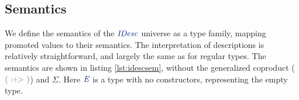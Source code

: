 \documentclass[a4paper,msc,twosized=semi]{uustthesis}
\newcommand*{\mathcolor}{}
\def\mathcolor#1#{\mathcoloraux{#1}}
\newcommand*{\mathcoloraux}[3]{%
  \protect\leavevmode
  \begingroup
    \color#1{#2}#3%
  \endgroup
}
\newcommand{\HSSpecial}[1]{\mathcolor{hsblue4}{#1}}
\newcommand{\HSCon}[1]{\mathcolor{hsblue3}{\mathit{#1}}}
\begin{document}
\subsection{Semantics}

  We define the semantics of the \ensuremath{\HSCon{IDesc}} universe as a type family, mapping promoted 
  values to their semantics. The interpretation of descriptions is relatively 
  straightforward, and largely the same as for regular types. The semantics are shown 
  in listing \ref{lst:idescsem}, without the generalized coproduct (\ensuremath{\HSSpecial{(}\ {\color{gray}\mathbin{:\hspace{-0.1pt}\mathclap{\raisebox{0.1pt}{\scalebox{.9}{$+$}}}\hspace{-0.3pt}>}}\ \HSSpecial{)}}) and \ensuremath{\Sigma }. Here \ensuremath{\HSCon{E}} is a type with no constructors, representing the empty type. 
  
\end{document}
